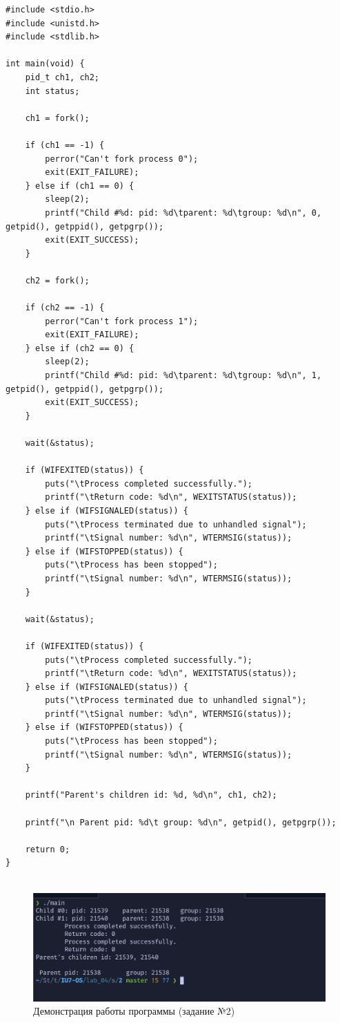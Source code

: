 \documentclass[a4paper,14pt]{article}
\begin{document}
\begin{lstlisting}[style=C, caption=Системный вызов wait().]
#include <stdio.h>
#include <unistd.h>
#include <stdlib.h>

int main(void) {
	pid_t ch1, ch2;
	int status;

	ch1 = fork();

	if (ch1 == -1) {
		perror("Can't fork process 0");
		exit(EXIT_FAILURE);
	} else if (ch1 == 0) {
		sleep(2);
		printf("Child #%d: pid: %d\tparent: %d\tgroup: %d\n", 0, getpid(), getppid(), getpgrp());
		exit(EXIT_SUCCESS);
	}

	ch2 = fork();

	if (ch2 == -1) {
		perror("Can't fork process 1");
		exit(EXIT_FAILURE);
	} else if (ch2 == 0) {
		sleep(2);
		printf("Child #%d: pid: %d\tparent: %d\tgroup: %d\n", 1, getpid(), getppid(), getpgrp());
		exit(EXIT_SUCCESS);
	}

	wait(&status);
	
	if (WIFEXITED(status)) {
		puts("\tProcess completed successfully.");
		printf("\tReturn code: %d\n", WEXITSTATUS(status));
	} else if (WIFSIGNALED(status)) {
		puts("\tProcess terminated due to unhandled signal");
		printf("\tSignal number: %d\n", WTERMSIG(status));
	} else if (WIFSTOPPED(status)) {
		puts("\tProcess has been stopped");
		printf("\tSignal number: %d\n", WTERMSIG(status));
	}

	wait(&status);
	
	if (WIFEXITED(status)) {
		puts("\tProcess completed successfully.");
		printf("\tReturn code: %d\n", WEXITSTATUS(status));
	} else if (WIFSIGNALED(status)) {
		puts("\tProcess terminated due to unhandled signal");
		printf("\tSignal number: %d\n", WTERMSIG(status));
	} else if (WIFSTOPPED(status)) {
		puts("\tProcess has been stopped");
		printf("\tSignal number: %d\n", WTERMSIG(status));
	}

	printf("Parent's children id: %d, %d\n", ch1, ch2);

	printf("\n Parent pid: %d\t group: %d\n", getpid(), getpgrp());

	return 0;
}
	
\end{lstlisting}


\begin{figure}[ht]
	\centering
	\includegraphics[scale=0.7]{2.png}
	\caption{Демонстрация работы программы (задание №2)}
	\label{fig:2}
\end{figure}
\end{document}
